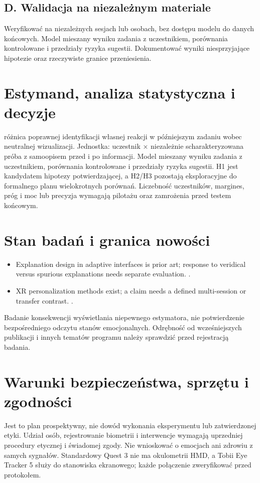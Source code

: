 \documentclass[11pt,a4paper]{article}
\begin{document}
\subsection{D. Walidacja na niezależnym materiale}
Weryfikować na niezależnych sesjach lub osobach, bez dostępu modelu do danych końcowych. Model mieszany wyniku zadania z uczestnikiem, porównania kontrolowane i przedziały ryzyka sugestii. Dokumentować wyniki niesprzyjające hipotezie oraz rzeczywiste granice przeniesienia.
\section{Estymand, analiza statystyczna i decyzje}
różnica poprawnej identyfikacji własnej reakcji w późniejszym zadaniu wobec neutralnej wizualizacji. Jednostka: uczestnik × niezależnie scharakteryzowana próba z samoopisem przed i po informacji. Model mieszany wyniku zadania z uczestnikiem, porównania kontrolowane i przedziały ryzyka sugestii. H1 jest kandydatem hipotezy potwierdzającej, a H2/H3 pozostają eksploracyjne do formalnego planu wielokrotnych porównań. Liczebność uczestników, margines, próg i moc lub precyzja wymagają pilotażu oraz zamrożenia przed testem końcowym.
\section{Stan badań i granica nowości}
\begin{itemize}
\item Explanation design in adaptive interfaces is prior art; response to veridical versus spurious explanations needs separate evaluation. \cite{xrprior1}.
\item XR personalization methods exist; a claim needs a defined multi-session or transfer contrast. \cite{xrprior2}.
\end{itemize}
Badanie konsekwencji wyświetlania niepewnego estymatora, nie potwierdzenie bezpośredniego odczytu stanów emocjonalnych. Odrębność od wcześniejszych publikacji i innych tematów programu należy sprawdzić przed rejestracją badania.
\section{Warunki bezpieczeństwa, sprzętu i zgodności}
Jest to plan prospektywny, nie dowód wykonania eksperymentu lub zatwierdzonej etyki. Udział osób, rejestrowanie biometrii i interwencje wymagają uprzedniej procedury etycznej i świadomej zgody. Nie wnioskować o emocjach ani zdrowiu z samych sygnałów. Standardowy Quest 3 nie ma okulometrii HMD, a Tobii Eye Tracker 5 służy do stanowiska ekranowego; każde połączenie zweryfikować przed protokołem.
\end{document}
